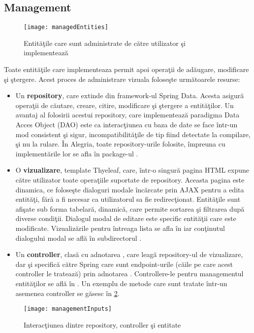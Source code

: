 \subsection{Management}
\begin{figure}[H]
	\centering
	\texttt{[image: managedEntities]}
	\captionsetup{justification=centering}
	\caption{Entităţile care sunt administrate de către utilizator şi implementează }
	\label{fig:managedEntities}
\end{figure}
Toate entităţile care implementeaza  permit apoi operaţii de adăugare, modificare şi ştergere. Acest proces de administrare vizuala foloseşte următoarele resurse:
\begin{itemize}
	\item Un \textbf{repository}, care extinde  din framework-ul Spring Data. Acesta asigură operaţii de căutare, creare, citire, modificare şi ştergere a entităţilor. Un avantaj al folosirii  acestui repository, care implementează paradigma Data Acces Object (DAO) este ca interacţiunea cu baza de date se face într-un mod consistent şi sigur, incompatibilităţile de tip fiind detectate la compilare, şi nu la rulare. În Alegria, toate repository-urile folosite, împreuna cu implementările lor se afla în package-ul .
	\item O \textbf{vizualizare}, template Thyeleaf, care, într-o singură pagina HTML expune către utilizator toate operaţiile suportate de repository. Aceasta pagina este dinamica, ce foloseşte dialoguri modale încărcate prin AJAX pentru a edita entităţi, fără a fi necesar ca utilizatorul sa fie redirecţionat. Entităţile sunt afişate sub forma tabelară, dinamică, care permite sortarea şi filtrarea după diverse condiţii. Dialogul modal de editare este specific entităţii care este modificate. Vizualizările pentru întreaga lista se afla în  iar conţinutul dialogului modal se află în subdirectorul .
	\item Un \textbf{controller}, clasă cu adnotarea , care leagă repository-ul de vizualizare, dar şi specifică către Spring care sunt endpoint-urile (căile pe care acest controller le tratează) prin adnotarea . Controllere-le pentru managementul entităţilor se află în . Un exemplu de metode care sunt tratate într-un asemenea controller se găsesc în \cref{fig:managementInputs}.
\end{itemize}
\begin{figure}[H]
	\centering
	\captionsetup{justification=centering}
	\texttt{[image: managementInputs]}
	\caption{Interacţiunea dintre repository, controller şi entitate}
	\label{fig:managementInputs}
\end{figure}

